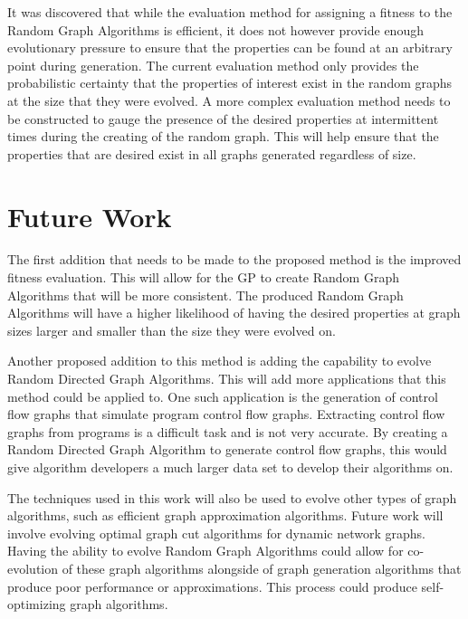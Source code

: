 \documentclass{article}
\begin{document}
It was discovered that while the evaluation method for assigning a fitness to the Random Graph Algorithms is efficient, it does not however provide
enough evolutionary pressure to ensure that the properties can be found at an arbitrary point during generation. The current evaluation method only 
provides the probabilistic certainty that the properties of interest exist in the random graphs at the size that they were evolved. A more complex evaluation
method needs to be constructed to gauge the presence of the desired properties at intermittent times during the creating of the random graph. This will
help ensure that the properties that are desired exist in all graphs generated regardless of size. 


\section{Future Work}
The first addition that needs to be made to the proposed method is the improved fitness evaluation. This will allow for the GP to create Random Graph
Algorithms that will be more consistent. The produced Random Graph Algorithms will have a higher likelihood of having the desired properties at
graph sizes larger and smaller than the size they were evolved on.

Another proposed addition to this method is adding the capability to evolve Random Directed Graph Algorithms. This will add more applications
that this method could be applied to. One such application is the generation of control flow graphs that simulate program control flow graphs. Extracting
control flow graphs from programs is a difficult task and is not very accurate. By creating a Random Directed Graph Algorithm to generate control flow graphs,
this would give algorithm developers a much larger data set to develop their algorithms on. 

The techniques used in this work will also be used to evolve other types of graph algorithms, such as efficient graph approximation algorithms. Future work will
involve evolving optimal graph cut algorithms for dynamic network graphs. Having the ability to evolve Random Graph Algorithms could allow for co-evolution of these
graph algorithms alongside of graph generation algorithms that produce poor performance or approximations. This process could produce self-optimizing graph algorithms. 


 
\end{document}
